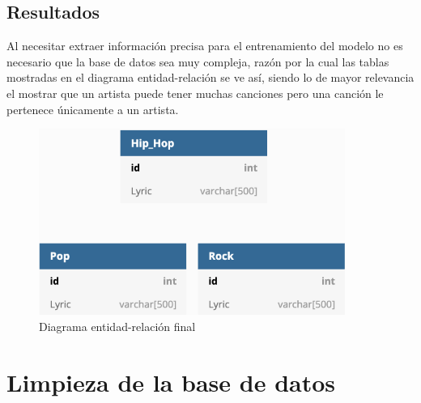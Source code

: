 \documentclass[12pt, a4paper, titlepage]{report}
\begin{document}
		\subsection{Resultados}
		Al necesitar extraer información precisa para el entrenamiento del modelo no es necesario que la base de datos sea muy compleja, razón por la cual las tablas mostradas en el diagrama entidad-relación se ve así, siendo lo de mayor relevancia el mostrar que un artista puede tener muchas canciones pero una canción le pertenece únicamente a un artista.
		\begin{figure}[H]
			\includegraphics[width=10cm]{./imagenes/Disenio/Iteracion_1/Base_de_Datos/Hip_Hop.png}
			\centering 
			\caption{Diagrama entidad-relación final}
		\end{figure}
		
		
\newpage
	
	\section{Limpieza de la base de datos} %
\end{document}
